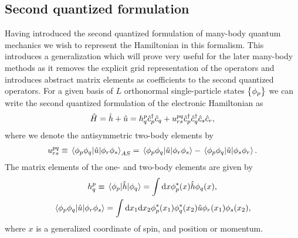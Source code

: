        \subsection{Second quantized formulation}
            Having introduced the second quantized formulation of many-body
            quantum mechanics we wish to represent the Hamiltonian in this
            formalism.
            This introduces a generalization which will prove very useful for
            the later many-body methods as it removes the explicit grid
            representation of the operators and introduces abstract matrix
            elements as coefficients to the second quantized operators.
            For a given basis of $L$ orthonormal single-particle states
            $\left\{ \phi_{p} \right\}$ we can write the second quantized formulation of
            the electronic Hamiltonian as
            \begin{align}
                \hat{H}
                =
                \hat{h}
                + \hat{u}
                =
                h^{p}_{q}
                \hat{c}_{p}^{\dagger}
                \hat{c}_{q}
                +
                u^{pq}_{rs}
                \hat{c}_{p}^{\dagger}
                \hat{c}_{q}^{\dagger}
                \hat{c}_{s}
                \hat{c}_{r},
                \label{eq:electronic-hamiltonian}
            \end{align}
            where we denote the antisymmetric two-body elements by
            \begin{align}
                u^{pq}_{rs}
                \equiv
                \mel*{\phi_p\phi_q}{\hat{u}}{\phi_r\phi_s}_{AS}
                =
                \mel*{\phi_p\phi_q}{\hat{u}}{\phi_r\phi_s}
                -
                \mel*{\phi_p\phi_q}{\hat{u}}{\phi_s\phi_r}.
                \label{eq:antisymmetric_two_body}
            \end{align}
            The matrix elements of the one- and two-body elements are given by
            \begin{gather}
                h^{p}_{q}
                \equiv
                \mel*{\phi_{p}}{\hat{h}}{\phi_{q}}
                =
                \int\dd x\phi^{*}_{p}(x)\hat{h}\phi_q(x),
                \label{eq:h_pq}
                \\
                \mel*{\phi_p\phi_q}{\hat{u}}{\phi_r\phi_s}
                =
                \int\dd x_1\dd x_2
                \phi^{*}_p(x_1)
                \phi^{*}_q(x_2)
                \hat{u}
                \phi_{r}(x_1)
                \phi_{s}(x_2),
                \label{eq:u_pqrs}
            \end{gather}
            where $x$ is a generalized coordinate of spin, and position or
            momentum.

